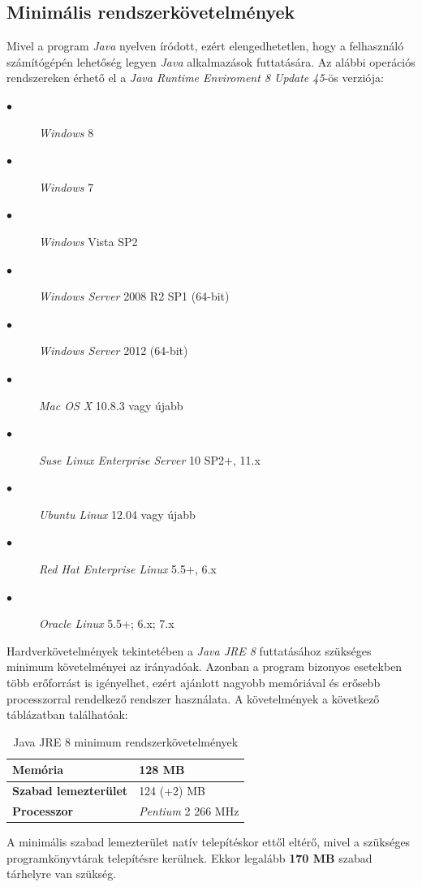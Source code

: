 \documentclass{elteikthesis}
\begin{document}
\subsection{Minimális rendszerkövetelmények}
Mivel a program \emph{Java} nyelven íródott, ezért elengedhetetlen, hogy a felhasználó számítógépén lehetőség legyen \emph{Java} alkalmazások futtatására. Az alábbi operációs rendszereken érhető el a \emph{Java Runtime Enviroment 8 Update 45}-ös verziója:\par
\begin{description}
	\item[$\bullet$] \emph{Windows} 8
	\item[$\bullet$] \emph{Windows} 7
	\item[$\bullet$] \emph{Windows} Vista SP2
	\item[$\bullet$] \emph{Windows Server} 2008 R2 SP1 (64-bit)
	\item[$\bullet$] \emph{Windows Server} 2012 (64-bit)
	\item[$\bullet$] \emph{Mac OS X} 10.8.3 vagy újabb
	\item[$\bullet$] \emph{Suse Linux Enterprise Server} 10 SP2+, 11.x
	\item[$\bullet$] \emph{Ubuntu Linux} 12.04 vagy újabb
	\item[$\bullet$] \emph{Red Hat Enterprise Linux} 5.5+, 6.x
	\item[$\bullet$] \emph{Oracle Linux} 5.5+; 6.x; 7.x
\end{description}
\par Hardverkövetelmények tekintetében a \emph{Java JRE 8} futtatásához szükséges
minimum követelményei az irányadóak. Azonban a program bizonyos esetekben több erőforrást is igényelhet, ezért ajánlott nagyobb memóriával és erősebb processzorral rendelkező rendszer használata. A követelmények a következő táblázatban találhatóak:\par
\begin{table}[H]
		\def\arraystretch{2}
		\centering
	\begin{tabular}{|l|l|}
		\hline
		\textbf{Memória}           & 128 MB            \\ \hline
		\textbf{Szabad lemezterület} & 124 (+2) MB       \\ \hline
		\textbf{Processzor}          & \emph{Pentium} 2 266 MHz \\ \hline
	\end{tabular}
	\caption{Java JRE 8 minimum rendszerkövetelmények}
\end{table}
A minimális szabad lemezterület natív telepítéskor ettől eltérő, mivel a szükséges programkönyvtárak telepítésre kerülnek. Ekkor legalább \textbf{170 MB} szabad tárhelyre van szükség.
\end{document}
